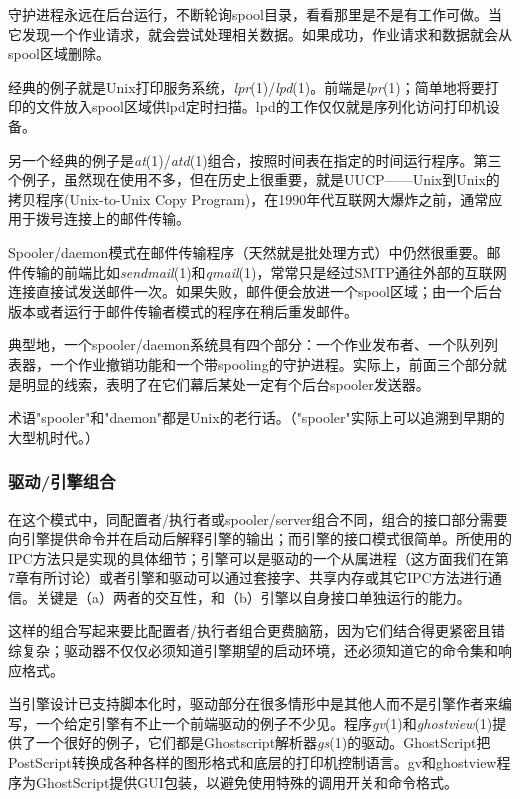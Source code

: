\documentclass[12pt,oneside]{book}
\begin{document}
守护进程永远在后台运行，不断轮询spool目录，看看那里是不是有工作可做。当它发现一个作业请求，就会尝试处理相关数据。如果成功，作业请求和数据就会从spool区域删除。

经典的例子就是Unix打印服务系统，\textit{lpr}(1)/\textit{lpd}(1)。前端是\textit{lpr}(1)；简单地将要打印的文件放入spool区域供lpd定时扫描。lpd的工作仅仅就是序列化访问打印机设备。

另一个经典的例子是\textit{at}(1)/\textit{atd}(1)组合，按照时间表在指定的时间运行程序。第三个例子，虽然现在使用不多，但在历史上很重要，就是UUCP——Unix到Unix的拷贝程序(Unix-to-Unix Copy Program)，在1990年代互联网大爆炸之前，通常应用于拨号连接上的邮件传输。

Spooler/daemon模式在邮件传输程序（天然就是批处理方式）中仍然很重要。邮件传输的前端比如\textit{sendmail}(1)和\textit{qmail}(1)，常常只是经过SMTP通往外部的互联网连接直接试发送邮件一次。如果失败，邮件便会放进一个spool区域；由一个后台版本或者运行于邮件传输者模式的程序在稍后重发邮件。

典型地，一个spooler/daemon系统具有四个部分：一个作业发布者、一个队列列表器，一个作业撤销功能和一个带spooling的守护进程。实际上，前面三个部分就是明显的线索，表明了在它们幕后某处一定有个后台spooler发送器。

术语"spooler"和"daemon"都是Unix的老行话。（"spooler"实际上可以追溯到早期的大型机时代。）

\subsubsection{驱动/引擎组合}
在这个模式中，同配置者/执行者或spooler/server组合不同，组合的接口部分需要向引擎提供命令并在启动后解释引擎的输出；而引擎的接口模式很简单。所使用的IPC方法只是实现的具体细节；引擎可以是驱动的一个从属进程（这方面我们在第7章有所讨论）或者引擎和驱动可以通过套接字、共享内存或其它IPC方法进行通信。关键是（a）两者的交互性，和（b）引擎以自身接口单独运行的能力。

这样的组合写起来要比配置者/执行者组合更费脑筋，因为它们结合得更紧密且错综复杂；驱动器不仅仅必须知道引擎期望的启动环境，还必须知道它的命令集和响应格式。

当引擎设计已支持脚本化时，驱动部分在很多情形中是其他人而不是引擎作者来编写，一个给定引擎有不止一个前端驱动的例子不少见。程序\textit{gv}(1)和\textit{ghostview}(1)提供了一个很好的例子，它们都是Ghostscript解析器\textit{gs}(1)的驱动。GhostScript把PostScript转换成各种各样的图形格式和底层的打印机控制语言。gv和ghostview程序为GhostScript提供GUI包装，以避免使用特殊的调用开关和命令格式。
\end{document}
